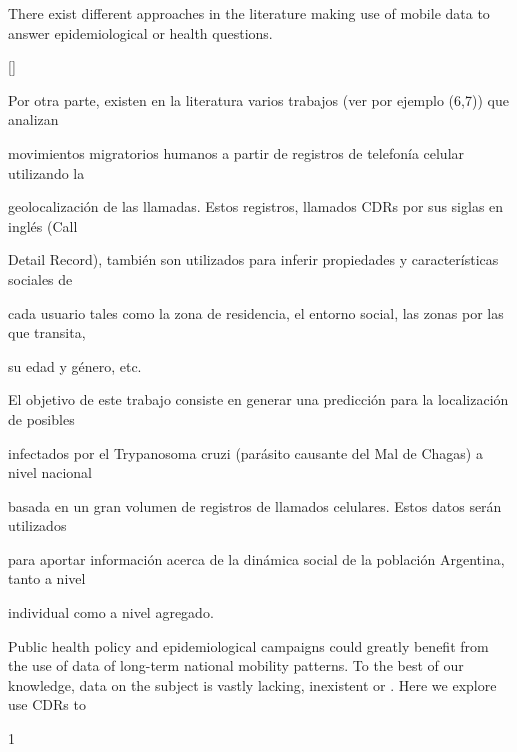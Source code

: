 There exist different approaches in the literature making use of mobile data to answer epidemiological or health questions. \begin{comment} La siguiente info la saco de aqui  https://docs.google.com/document/d/1ZClgYFTLCxmg7wvRXqz2V1EP7Wcg0vd2ZwEBOLW2VOk \end{comment} \ref{}

Por otra parte, existen en la literatura varios trabajos (ver por ejemplo (6,7)) que analizan

movimientos migratorios humanos a partir de registros de telefonía celular utilizando la

geolocalización de las llamadas. Estos registros, llamados CDRs por sus siglas en inglés (Call

Detail Record), también son utilizados para inferir propiedades y características sociales de

cada usuario tales como la zona de residencia, el entorno social, las zonas por las que transita,

su edad y género, etc.


El objetivo de este trabajo consiste en generar una predicción para la localización de posibles

infectados por el Trypanosoma cruzi (parásito causante del Mal de Chagas) a nivel nacional

basada en un gran volumen de registros de llamados celulares. Estos datos serán utilizados

para aportar información acerca de la dinámica social de la población Argentina, tanto a nivel

individual como a nivel agregado. 


Public health policy and epidemiological campaigns could greatly benefit from the use of data of long-term national mobility patterns. To the best of our knowledge, data on the subject is vastly lacking, inexistent or . Here we explore use CDRs to  

1